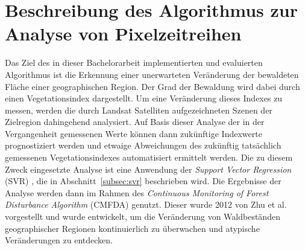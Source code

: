 \section[Beschreibung des Algorithmus]{Beschreibung des Algorithmus zur Analyse von Pixelzeitreihen}
\label{sec:DescriptionOfTheAlgorithm}
Das Ziel des in dieser Bachelorarbeit implementierten und evaluierten Algorithmus ist die Erkennung einer unerwarteten Veränderung der bewaldeten Fläche einer geographischen Region. Der Grad der Bewaldung wird dabei durch einen Vegetationsindex dargestellt. Um eine Veränderung dieses Indexes zu messen, werden die durch Landsat Satelliten aufgezeichneten Szenen der Zielregion dahingehend analysiert. Auf Basis dieser Analyse der in der Vergangenheit gemessenen Werte können dann zukünftige Indexwerte prognostiziert werden und etwaige Abweichungen des zukünftig tatsächlich gemessenen Vegetationsindexes automatisiert ermittelt werden. Die zu diesem Zweck eingesetzte Analyse ist eine Anwendung der \textit{Support Vector Regression} (SVR) \cite{Basak2007}, die in Abschnitt~\ref{subsec:svr} beschrieben wird. Die Ergebnisse der Analyse werden dann im Rahmen des \textit{Continuous Monitoring of Forest Disturbance Algorithm} (CMFDA) \cite{Zhu2012} genutzt. Dieser wurde 2012 von Zhu et al. vorgestellt \cite{Zhu2012} und wurde entwickelt, um die Veränderung von Waldbeständen geographischer Regionen kontinuierlich zu überwachen und atypische Veränderungen zu entdecken. 
%
